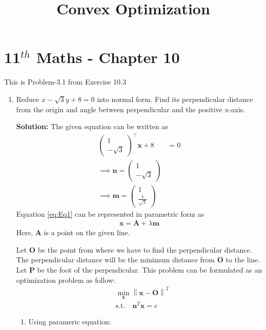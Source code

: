 \documentclass[12pt]{article}
\providecommand{\norm}[1]{\left\lVert#1\right\rVert}
\newcommand{\solution}{\noindent \textbf{Solution: }}
\newcommand{\myvec}[1]{\ensuremath{\begin{pmatrix}#1\end{pmatrix}}}
\let\vec\mathbf
\begin{document}
\begin{center}
\title{\textbf{Convex Optimization}}
\date{\vspace{-5ex}} %
\maketitle
\end{center}
\setcounter{page}{1}

\section{11$^{th}$ Maths - Chapter 10}
This is Problem-3.1 from Exercise 10.3 
\begin{enumerate}
\item Reduce $x-\sqrt{3}y+8=0$ into normal form. Find its perpendicular distance from the origin and angle between perpendicular and the positive x-axis. 

\solution 
The given equation can be written as
\begin{align}
	\label{eq:Eq1}
	\myvec{1 \\ -\sqrt{3}}^\top\vec{x}+8 &= 0 \\
	\implies \vec{n} = \myvec{1 \\ -\sqrt{3}} \\
	\implies \vec{m} = \myvec{1 \\ \frac{1}{\sqrt{3}}}
\end{align}
Equation \eqref{eq:Eq1} can be represented in parametric form as
\begin{align}
	\label{eq:Eq2}
	\vec{x} = \vec{A}+\lambda\vec{m}
\end{align}
Here, $\vec{A}$ is a point on the given line. 

Let $\vec{O}$ be the point from where we have to find the perpendicular distance. The perpendicular distance will be the minimum distance from $\vec{O}$ to the line. Let $\vec{P}$ be the foot of the perpendicular. This problem can be formulated as an optimization problem as follow:
\begin{align}
	\label{eq:Eq3}
	&  \min_{\vec{x}} \norm{\vec{x}-\vec{O}}^2\\
	& \text{s.t.} \quad \vec{n}^T\vec{x} = c 
\end{align}
\begin{enumerate}
\item Using parameric equation:


\end{enumerate}
\end{enumerate}
\end{document}
